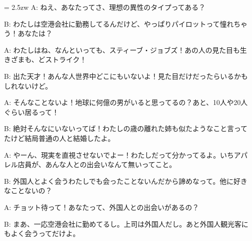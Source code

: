 \documentclass[11pt]{amsart}
\title{}
\author{}
\newenvironment{hangall}[1]{\hangindent = 2.5zw\everypar{\hangindent = 2.5zw}}{}
\begin{document}
\maketitle
\begin{hangall}{}%
A: ねえ、あなたってさ、理想の異性のタイプってある？

B: わたしは空港会社に勤務してるんだけど、やっぱりパイロットって憧れちゃう！あなたは？

A: わたしはね、なんといっても、スティーブ・ジョブズ！あの人の見た目も生きざまも、どストライク！

B: 出た天才！あんな人世界中どこにもいないよ！見た目だけだったらいるかもしれないけど。

A: そんなことないよ！地球に何億の男がいると思ってるの？あと、10人や20人ぐらい居るって！

B: 絶対そんなにいないってば！わたしの歳の離れた姉も似たようなこと言ってたけど結局普通の人と結婚したよ。

A: やーん、現実を直視させないでよー！わたしだって分かってるよ。いちアパレル店員が、あんな人との出会いなんて無いってこと。

B: 外国人とよく会うわたしでも会ったことないんだから諦めなって。他に好きなことないの？

A: チョット待って！あなたって、外国人との出会いがあるの？

B: まあ、一応空港会社に勤めてるし。上司は外国人だし。あと外国人観光客にもよく会うってだけよ。
\end{hangall}
\end{document}
